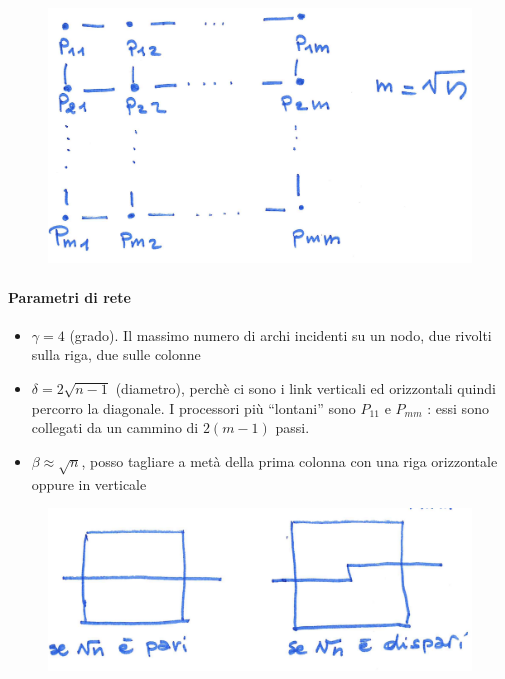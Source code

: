 \begin{figure}[h]
    \centering
    \includegraphics[scale=0.4]{images/architetture_mesh.png}
\end{figure}

\paragraph{Parametri di rete}
\begin{itemize}
    \item $\gamma = 4$ (grado). Il massimo numero di archi incidenti su un nodo, due rivolti sulla riga, due sulle colonne
    \item $\delta = 2\sqrt{n-1}$ (diametro), perchè ci sono i link verticali ed orizzontali quindi percorro la diagonale. I processori più “lontani” sono $P_{11}$ e $P_{mm}$ : essi sono collegati da un cammino di $2(m-1)$ passi.
    \item $\beta \approx \sqrt{n} $, posso tagliare a metà della prima colonna con una riga orizzontale oppure in verticale
\end{itemize}

\begin{figure}[h]
    \centering
    \includegraphics[scale=0.4]{images/architettura_mesh2.png}
\end{figure}

